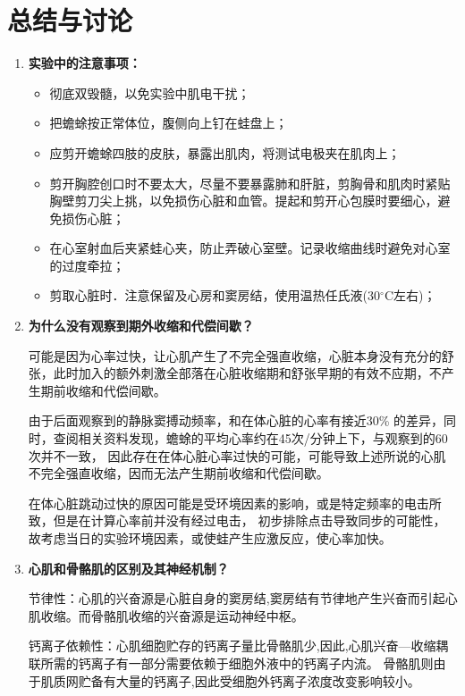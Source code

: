 \documentclass[UTF8]{article}
\begin{document}
    \section{总结与讨论}
    \begin{enumerate}
        \item {
          \textbf{实验中的注意事项：}
          \begin{itemize}
            \item 彻底双毁髓，以免实验中肌电干扰；
            \item 把蟾蜍按正常体位，腹侧向上钉在蛙盘上；
            \item 应剪开蟾蜍四肢的皮肤，暴露出肌肉，将测试电极夹在肌肉上；
            \item 剪开胸腔创口时不要太大，尽量不要暴露肺和肝脏，剪胸骨和肌肉时紧贴胸壁剪刀尖上挑，以免损伤心脏和血管。提起和剪开心包膜时要细心，避免损伤心脏；
            \item 在心室射血后夹紧蛙心夹，防止弄破心室壁。记录收缩曲线时避免对心室的过度牵拉；
            \item 剪取心脏时．注意保留及心房和窦房结，使用温热任氏液(30$^{\circ}$C左右)； 
          \end{itemize}
        }
        \item {
          \textbf{为什么没有观察到期外收缩和代偿间歇？}

          可能是因为心率过快，让心肌产生了不完全强直收缩，心脏本身没有充分的舒张，此时加入的额外刺激全部落在心脏收缩期和舒张早期的有效不应期，不产生期前收缩和代偿间歇。

          由于后面观察到的静脉窦搏动频率，和在体心脏的心率有接近30\% 的差异，同时，查阅相关资料发现，蟾蜍的平均心率约在45次/分钟上下，与观察到的60次并不一致，
          因此存在在体心脏心率过快的可能，可能导致上述所说的心肌不完全强直收缩，因而无法产生期前收缩和代偿间歇。

          在体心脏跳动过快的原因可能是受环境因素的影响，或是特定频率的电击所致，但是在计算心率前并没有经过电击，
          初步排除点击导致同步的可能性，故考虑当日的实验环境因素，或使蛙产生应激反应，使心率加快。
        }
        \item {
          \textbf{心肌和骨骼肌的区别及其神经机制？}

          节律性：心肌的兴奋源是心脏自身的窦房结,窦房结有节律地产生兴奋而引起心肌收缩。而骨骼肌收缩的兴奋源是运动神经中枢。

          钙离子依赖性：心肌细胞贮存的钙离子量比骨骼肌少,因此,心肌兴奋—收缩耦联所需的钙离子有一部分需要依赖于细胞外液中的钙离子内流。
          骨骼肌则由于肌质网贮备有大量的钙离子,因此受细胞外钙离子浓度改变影响较小。

}
\end{enumerate}
\end{document}
